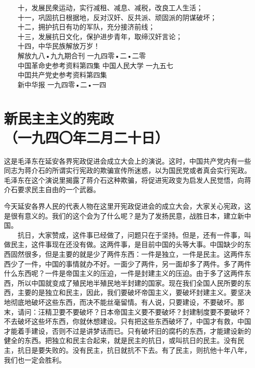 \documentclass[cn,11pt,chinese]{elegantbook}
\def\myformat#1{\hfil\hfil #1}
\begin{document}
　　十，发展民衆运动，实行减租、减息、减税，改良工人生活；\\
　　十一，巩固抗日根据地，反对汉奸、反共派、顽固派的阴谋破坏；\\
　　十二，拥护抗日有功的军队，充分接济前线；\\
　　十三，发展抗日文化，保护进步青年，取缔汉奸言论；\\
　　十四，中华民族解放万岁！\\
　　解放九八•九九期合刊 一九四零•二•二零\\
　　中国革命史参考资料第四集 中国人民大学 一九五七\\
　　中囯共产党史参考资料第四集\\
　　新中华报 一九四零•二•一四　\\
\newpage\section*{\myformat{新民主主义的宪政}\\\myformat{（一九四〇年二月二十日）}}
\begin{introduction}\item  这是毛泽东在延安各界宪政促进会成立大会上的演说。这时，中国共产党内有一些同志为蒋介石的所谓实行宪政的欺骗宣传所迷惑，以为国民党或者真会实行宪政。毛泽东在这个演说里揭露了蒋介石这种欺骗，将促进宪政变为启发人民觉悟，向蒋介石要求民主自由的一个武器。\end{introduction}
今天延安各界人民的代表人物在这里开宪政促进会的成立大会，大家关心宪政，这是很有意义的。我们的这个会为了什么呢？是为了发扬民意，战胜日本，建立新中国。\\
　　抗日，大家赞成，这件事已经做了，问题只在于坚持。但是，还有一件事，叫做民主，这件事现在还没有做。这两件事，是目前中国的头等大事。中国缺少的东西固然很多，但是主要的就是少了两件东西：一件是独立，一件是民主。这两件东西少了一件，中国的事情就办不好。一面少了两件，另一面却多了两件。多了两件什么东西呢？一件是帝国主义的压迫，一件是封建主义的压迫。由于多了这两件东西，所以中国就变成了殖民地半殖民地半封建的国家。现在我们全国人民所要的东西，主要的是独立和民主，因此，我们要破坏帝国主义，要破坏封建主义。要坚决地彻底地破坏这些东西，而决不能丝毫留情。有人说，只要建设，不要破坏。那末，请问：汪精卫要不要破坏？日本帝国主义要不要破坏？封建制度要不要破坏？不去破坏这些坏东西，你就休想建设。只有把这些东西破坏了，中国才有救，中国才能着手建设，否则不过是讲梦话而已。只有破坏旧的腐朽的东西，才能建设新的健全的东西。把独立和民主合起来，就是民主的抗日，或叫抗日的民主。没有民主，抗日是要失败的。没有民主，抗日就抗不下去。有了民主，则抗他十年八年，我们也一定会胜利。\\
\end{document}

